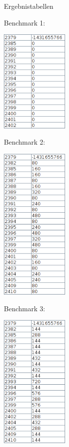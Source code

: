 \documentclass{beamer}
\begin{document}
\begin{frame}{Ergebnistabellen}

\begin{multicols}{3}
    Benchmark 1:
    
    \includegraphics[width=0.25\textwidth]{res/bench1_result.png}
    \vfill
    \columnbreak
    
    Benchmark 2:
    
    \includegraphics[width=0.25\textwidth]{res/bench2_result.png}
    \vfill
    \columnbreak
    
    Benchmark 3:
    
    \includegraphics[width=0.25\textwidth]{res/bench3_result.png}
\end{multicols}

\end{frame}
\end{document}
